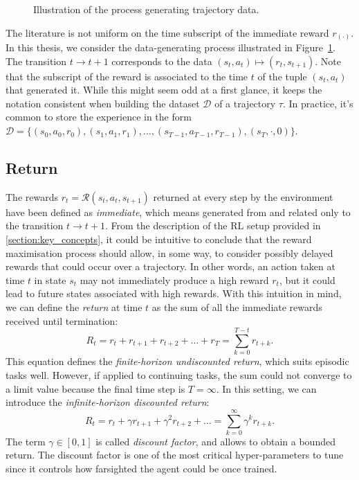 \begin{figure}
    \centering
    \caption{Illustration of the process generating trajectory data.}
    \label{fig:data_generating_process_mdp}
\end{figure}

\begin{remark*}
%
The literature is not uniform on the time subscript of the immediate reward $r_{(\cdot)}$.
In this thesis, we consider the data-generating process illustrated in Figure~\ref{fig:data_generating_process_mdp}.
The transition $t \rightarrow t+1$ corresponds to the data $(s_t, a_t) \mapsto (r_t, s_{t+1})$.
Note that the subscript of the reward is associated to the time $t$ of the tuple $(s_t, a_t)$ that generated it.
While this might seem odd at a first glance, it keeps the notation consistent when building the dataset $\mathcal{D}$ of a trajectory $\tau$.
In practice, it's common to store the experience in the form $\mathcal{D} = \{(s_0, a_0, r_0), (s_1, a_1, r_1), \dots, (s_{T-1}, a_{T-1}, r_{T-1}), (s_T, \cdot, 0)\}$.
%
\end{remark*}

\subsection{Return}

The rewards $r_t = \mathcal{R}(s_t, a_t, s_{t+1})$ returned at every step by the environment have been defined as \emph{immediate}, which means generated from and related only to the transition $t \rightarrow t+1$.
From the description of the \ac{RL} setup provided in \ref{section:key_concepts}, it could be intuitive to conclude that the reward maximisation process should allow, in some way, to consider possibly delayed rewards that could occur over a trajectory.
In other words, an action taken at time $t$ in state $s_t$ may not immediately produce a high reward $r_t$, but it could lead to future states associated with high rewards.
With this intuition in mind, we can define the \emph{return} at time $t$ as the sum of all the immediate rewards received until termination:
%
\begin{equation*}
    R_t = r_t + r_{t+1} + r_{t+2} + \dots + r_T = \sum_{k=0}^{T - t} r_{t+k} .
\end{equation*}
%
This equation defines the \emph{finite-horizon undiscounted return}, which suits episodic tasks well.
However, if applied to continuing tasks, the sum could not converge to a limit value because the final time step is $T=\infty$.
In this setting, we can introduce the \emph{infinite-horizon discounted return}:
%
\begin{equation*}
    R_t = r_t + \gamma r_{t+1} + \gamma^2 r_{t+2} + \dots = \sum_{k=0}^{\infty} \gamma^k r_{t+k} .
\end{equation*}
%
The term $\gamma \in [0, 1]$ is called \emph{discount factor}, and allows to obtain a bounded return.
The discount factor is one of the most critical hyper-parameters to tune since it controls how farsighted the agent could be once trained.

